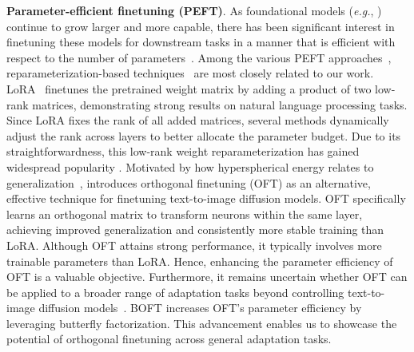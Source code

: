 \textbf{Parameter-efficient finetuning (PEFT)}. As foundational models (\emph{e.g.}, \cite{brown2020language,radford2021learning,rombach2022high,kirillov2023segment}) continue to grow larger and more capable, there has been significant interest in finetuning these models for downstream tasks in a manner that is efficient with respect to the number of parameters~\cite{treviso2023efficient,ding2023parameter,lialin2023scaling}. Among the various PEFT approaches~\cite{houlsby2019parameter,aghajanyan2020intrinsic,hulora2022,edalati2022krona,wang2022adamix,gheini2021cross,zaken2022bitfit,guo2020parameter,sung2021training,ansell2022composable,lester2021power,li2021prefix,vu2022spot,he2021towards,mao2021unipelt,karimi2021compacter,liu2022few,sung2022lst,chen2022parameter,jia2022visual,chen2022adaptformer,zhang2022neural,jie2023fact,lian2022scaling,luo2023towards}, reparameterization-based techniques~\cite{aghajanyan2020intrinsic,hulora2022,edalati2022krona} are most closely related to our work. LoRA~\cite{hulora2022} finetunes the pretrained weight matrix by adding a product of two low-rank matrices, demonstrating strong results on natural language processing tasks. Since LoRA fixes the rank of all added matrices, several methods \cite{zhang2022adaptive,valipour2022dylora,zhang2023increlora} dynamically adjust the rank across layers to better allocate the parameter budget. Due to its straightforwardness, this low-rank weight reparameterization has gained widespread popularity \cite{dettmers2023qlora,zi2023delta,chavan2023one}. Motivated by how hyperspherical energy relates to generalization~\cite{liu2018learning,liu2021orthogonal}, \cite{qiu2023controlling} introduces orthogonal finetuning (OFT) as an alternative, effective technique for finetuning text-to-image diffusion models. OFT specifically learns an orthogonal matrix to transform neurons within the same layer, achieving improved generalization and consistently more stable training than LoRA. Although OFT attains strong performance, it typically involves more trainable parameters than LoRA. Hence, enhancing the parameter efficiency of OFT is a valuable objective. Furthermore, it remains uncertain whether OFT can be applied to a broader range of adaptation tasks beyond controlling text-to-image diffusion models~\cite{qiu2023controlling}. BOFT increases OFT’s parameter efficiency by leveraging butterfly factorization. This advancement enables us to showcase the potential of orthogonal finetuning across general adaptation tasks.

